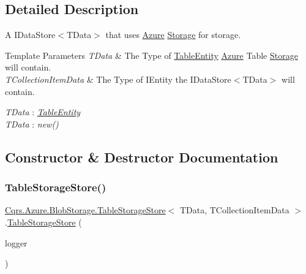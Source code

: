 \subsection{Detailed Description}
A I\+Data\+Store$<$\+T\+Data$>$ that uses \hyperlink{namespaceCqrs_1_1Azure}{Azure} \hyperlink{namespaceCqrs_1_1Azure_1_1Storage}{Storage} for storage. 


\begin{DoxyTemplParams}{Template Parameters}
{\em T\+Data} & The Type of \hyperlink{classCqrs_1_1Azure_1_1BlobStorage_1_1TableEntity}{Table\+Entity} \hyperlink{namespaceCqrs_1_1Azure}{Azure} Table \hyperlink{namespaceCqrs_1_1Azure_1_1Storage}{Storage} will contain.\\
\hline
{\em T\+Collection\+Item\+Data} & The Type of I\+Entity the I\+Data\+Store$<$\+T\+Data$>$ will contain.\\
\hline
\end{DoxyTemplParams}
\begin{Desc}
\item[Type Constraints]\begin{description}
\item[{\em T\+Data} : {\em \hyperlink{classCqrs_1_1Azure_1_1BlobStorage_1_1TableEntity}{Table\+Entity}}]\item[{\em T\+Data} : {\em new()}]\end{description}
\end{Desc}


\subsection{Constructor \& Destructor Documentation}
\mbox{\label{classCqrs_1_1Azure_1_1BlobStorage_1_1TableStorageStore_aabc36bc46ffb22b716cc7769a641cfab_aabc36bc46ffb22b716cc7769a641cfab}} 
\subsubsection{\texorpdfstring{Table\+Storage\+Store()}{TableStorageStore()}}
{\footnotesize\ttfamily \hyperlink{classCqrs_1_1Azure_1_1BlobStorage_1_1TableStorageStore}{Cqrs.\+Azure.\+Blob\+Storage.\+Table\+Storage\+Store}$<$ T\+Data, T\+Collection\+Item\+Data $>$.\hyperlink{classCqrs_1_1Azure_1_1BlobStorage_1_1TableStorageStore}{Table\+Storage\+Store} (\begin{DoxyParamCaption}\item[{I\+Logger}]{logger }\end{DoxyParamCaption})\hspace{0.3cm}{\ttfamily [protected]}}



